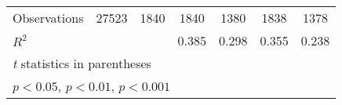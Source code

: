 \begin{table}[htbp]
\begin{tabular}{l*{6}{c}}
\midrule
Observations        &       27523         &        1840         &        1840         &        1380         &        1838         &        1378         \\
\(R^{2}\)           &                     &                     &       0.385         &       0.298         &       0.355         &       0.238         \\
\bottomrule
\multicolumn{7}{l}{\footnotesize \textit{t} statistics in parentheses}\\
\multicolumn{7}{l}{\footnotesize \sym{*} \(p<0.05\), \sym{**} \(p<0.01\), \sym{***} \(p<0.001\)}\\
\end{tabular}
\end{table}
